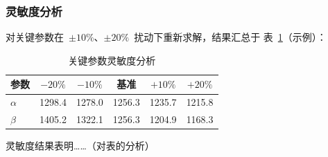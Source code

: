 \subsubsection{灵敏度分析}

对关键参数在~$\pm 10\%$、$\pm 20\%$~扰动下重新求解，结果汇总于
表~\ref{tab:q1_sensitivity}（示例）：

\begin{table}[htbp]
  \centering
  \caption{关键参数灵敏度分析}
  \label{tab:q1_sensitivity}
  \begin{tabular}{lccccc}
    \toprule
    \textbf{参数} & $-20\%$ & $-10\%$ & 基准 & $+10\%$ & $+20\%$ \\
    \midrule
    $\alpha$ & 1298.4 & 1278.0 & 1256.3 & 1235.7 & 1215.8 \\
    $\beta$  & 1405.2 & 1322.1 & 1256.3 & 1204.9 & 1168.3 \\
    \bottomrule
  \end{tabular}
\end{table}

灵敏度结果表明……（对表的分析）

\FloatBarrier

